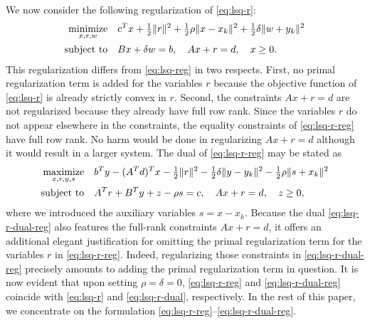 \documentclass{amsart}
\begin{document}
We now consider the following regularization of \eqref{eq:lsq-r}:
\begin{equation}
  \label{eq:lsq-r-reg}
  \begin{aligned}
    \displaystyle\mathop{\textup{minimize}}_{x, r, w} \quad &
      c^T x + \tfrac{1}{2} \|r\|^2 +
      \tfrac{1}{2} \rho \|x - x_k\|^2 +
      \tfrac{1}{2} \delta \|w + y_k\|^2 \\
    \mathop{\textup{subject to}} \quad &
      Bx + \delta w = b, \quad Ax + r = d, \quad x \geq 0.
  \end{aligned}
\end{equation}
This regularization differs from \eqref{eq:lsq-reg} in two respects. First,
no primal regularization term is added for the variables $r$ because the
objective function of \eqref{eq:lsq-r} is already strictly convex in $r$.
Second, the constraints $Ax + r = d$ are not regularized because they already
have full row rank. Since the variables $r$ do not appear elsewhere in the
constraints, the equality constraints of \eqref{eq:lsq-r-reg} have full row
rank. No harm would be done in regularizing $Ax + r = d$ although it would
result in a larger system. The dual of \eqref{eq:lsq-r-reg} may be stated as
\begin{equation}
  \label{eq:lsq-r-dual-reg}
  \begin{aligned}
    \displaystyle\mathop{\textup{maximize}}_{x, r, y, s} \quad &
      b^T y - (A^T d)^T x - \tfrac{1}{2} \|r\|^2 -
      \tfrac{1}{2} \delta \|y - y_k\|^2 -
      \tfrac{1}{2} \rho \|s + x_k\|^2 \\
    \mathop{\textup{subject to}} \quad &
      A^T r + B^T y + z - \rho s = c, \quad
      Ax + r = d, \quad
      z \geq 0,
  \end{aligned}
\end{equation}
where we introduced the auxiliary variables $s = x - x_k$. Because the dual
\eqref{eq:lsq-r-dual-reg} also features the full-rank constraints $Ax + r = d$,
it offers an additional elegant justification for omitting the primal
regularization term for the variables $r$ in \eqref{eq:lsq-r-reg}. Indeed,
regularizing those constraints in \eqref{eq:lsq-r-dual-reg} precisely amounts
to adding the primal regularization term in question. It is now evident that
upon setting $\rho = \delta = 0$, \eqref{eq:lsq-r-reg} and
\eqref{eq:lsq-r-dual-reg} coincide with \eqref{eq:lsq-r} and
\eqref{eq:lsq-r-dual}, respectively. In the rest of this paper, we concentrate
on the formulation \eqref{eq:lsq-r-reg}--\eqref{eq:lsq-r-dual-reg}.
\end{document}
